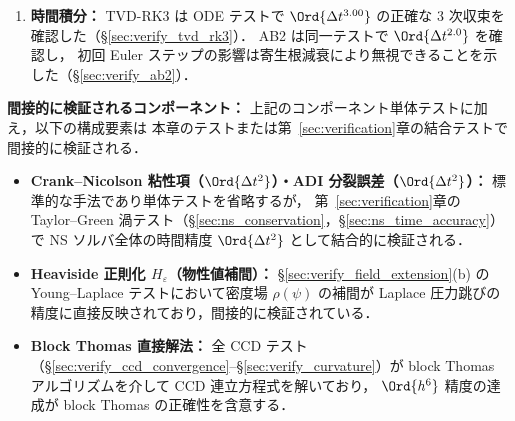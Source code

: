 \begin{enumerate}
        FD 直接法と比較して $N=128$ で $4{,}900$ 万倍高精度であり，コスト増は $3.4$ 倍に過ぎない．
        Neumann BC + ゲージ固定（§\ref{sec:verify_ppe_neumann}）では
        境界スキーム $\Ord{h^5}$ が律速する $\Ord{h^{5.0}}$ 収束を確認した．
        変密度条件（§\ref{sec:verify_ppe_varrho}）では
        滑らか密度場（$\rho_{\max}/\rho_{\min} \approx 999$）に対し
        $k = 3$ で $\Ord{h^{5.8}}$ を達成した．
        界面型密度場（smoothed Heaviside）での検証は今後の課題である．
  \item \textbf{時間積分：}
        TVD-RK3 は ODE テストで $\Ord{\Delta t^{3.00}}$ の正確な 3 次収束を確認した（§\ref{sec:verify_tvd_rk3}）．
        AB2 は同一テストで $\Ord{\Delta t^{2.0}}$ を確認し，
        初回 Euler ステップの影響は寄生根減衰により無視できることを示した（§\ref{sec:verify_ab2}）．
\end{enumerate}

\noindent\textbf{間接的に検証されるコンポーネント：}
上記のコンポーネント単体テストに加え，以下の構成要素は
本章のテストまたは第~\ref{sec:verification}章の結合テストで間接的に検証される．
\begin{itemize}[noitemsep]
  \item \textbf{Crank--Nicolson 粘性項（$\Ord{\Delta t^2}$）・ADI 分裂誤差（$\Ord{\Delta t^2}$）：}
        標準的な手法であり単体テストを省略するが，
        第~\ref{sec:verification}章の Taylor--Green 渦テスト（§\ref{sec:ns_conservation}，§\ref{sec:ns_time_accuracy}）で
        NS ソルバ全体の時間精度 $\Ord{\Delta t^2}$ として結合的に検証される．
  \item \textbf{Heaviside 正則化 $H_\varepsilon$（物性値補間）：}
        §\ref{sec:verify_field_extension}(b) の Young--Laplace テストにおいて密度場 $\rho(\psi)$ の補間が
        Laplace 圧力跳びの精度に直接反映されており，間接的に検証されている．
  \item \textbf{Block Thomas 直接解法：}
        全 CCD テスト（§\ref{sec:verify_ccd_convergence}--§\ref{sec:verify_curvature}）が
        block Thomas アルゴリズムを介して CCD 連立方程式を解いており，
        $\Ord{h^6}$ 精度の達成が block Thomas の正確性を含意する．
\end{itemize}

